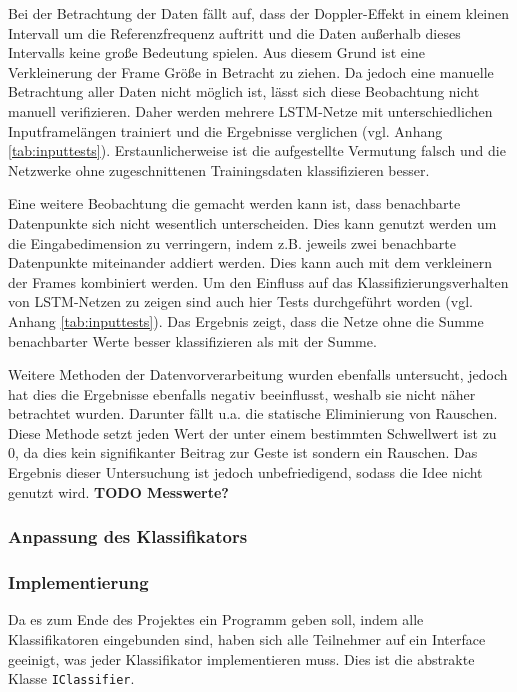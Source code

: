 Bei der Betrachtung der Daten fällt auf, dass der Doppler-Effekt in einem
kleinen Intervall um die Referenzfrequenz auftritt und die Daten außerhalb
dieses Intervalls keine große Bedeutung spielen. Aus diesem Grund ist eine
Verkleinerung der Frame Größe in Betracht zu ziehen. Da jedoch eine manuelle
Betrachtung aller Daten nicht möglich ist, lässt sich diese Beobachtung nicht
manuell verifizieren. Daher werden mehrere \ac{LSTM}-Netze mit unterschiedlichen
Inputframelängen trainiert und die Ergebnisse verglichen (vgl. Anhang
\autoref{tab:inputtests}). Erstaunlicherweise ist die aufgestellte Vermutung falsch
und die Netzwerke ohne zugeschnittenen Trainingsdaten klassifizieren besser.

Eine weitere Beobachtung die gemacht werden kann ist, dass benachbarte
Datenpunkte sich nicht wesentlich unterscheiden. Dies kann genutzt werden um die
Eingabedimension zu verringern, indem z.B. jeweils zwei benachbarte Datenpunkte
miteinander addiert werden. Dies kann auch mit dem verkleinern der Frames
kombiniert werden. Um den Einfluss auf das Klassifizierungsverhalten von
\ac{LSTM}-Netzen zu zeigen sind auch hier Tests durchgeführt worden (vgl. Anhang
\autoref{tab:inputtests}). Das Ergebnis zeigt, dass die Netze ohne
die Summe benachbarter Werte besser klassifizieren als mit der Summe. 

Weitere Methoden der Datenvorverarbeitung wurden ebenfalls untersucht, jedoch
hat dies die Ergebnisse ebenfalls negativ beeinflusst, weshalb sie nicht näher
betrachtet wurden. Darunter fällt u.a. die statische Eliminierung von Rauschen.
Diese Methode setzt jeden Wert der unter einem bestimmten Schwellwert ist zu 0,
da dies kein signifikanter Beitrag zur Geste ist sondern ein Rauschen. Das
Ergebnis dieser Untersuchung ist jedoch unbefriedigend, sodass die Idee nicht
genutzt wird. \textbf{TODO Messwerte?}
 


\subsubsection{Anpassung des Klassifikators}
\subsubsection{Implementierung}
Da es zum Ende des Projektes ein Programm geben soll, indem alle Klassifikatoren 
eingebunden sind, haben sich alle Teilnehmer auf ein Interface geeinigt, was 
jeder Klassifikator implementieren muss. Dies ist die abstrakte Klasse \texttt{IClassifier}.

